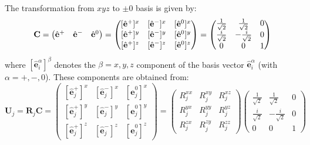 \documentclass[aps, prx, nofootinbib, superscriptaddress]{revtex4-2}
\begin{document}
The transformation from $xyz$ to $\pm0$ basis is given by:
\begin{equation}
    \mathbf{C} = 
    \begin{pmatrix}
        \hat{\bf e}^{+} & \hat{\bf e}^{-} & \hat{\bf e}^{0}
    \end{pmatrix}
    = 
    \begin{pmatrix}
        [\hat{\mathbf{e}}^{+}]^{x} & [\hat{\mathbf{e}}^{-}]^{x} & [\hat{\mathbf{e}}^{0}]^{x} \\[0.1em]
        [\hat{\mathbf{e}}^{+}]^{y} & [\hat{\mathbf{e}}^{-}]^{y} & [\hat{\mathbf{e}}^{0}]^{y} \\[0.1em]
        [\hat{\mathbf{e}}^{+}]^{z} & [\hat{\mathbf{e}}^{-}]^{z} & [\hat{\mathbf{e}}^{0}]^{z} 
    \end{pmatrix}
    = 
    \begin{pmatrix}
        \frac{1}{\sqrt{2}}  &   \frac{1}{\sqrt{2}}  &   0   \\[0.1em]
        \frac{i}{\sqrt{2}}  & - \frac{i}{\sqrt{2}}  &   0   \\[0.1em]
                    0       &           0           &   1   
    \end{pmatrix} 
\end{equation}
where $[\hat{\mathbf{e}}_{i}^{\alpha}]^{\beta}$ denotes the $\beta = x, y, z$ component of the basis vector $\hat{\mathbf{e}}_{i}^{\alpha}$ (with $\alpha = +, -, 0$). 
These components are obtained from:
\begin{equation}
    \mathbf{U}_{j} = \mathbf{R}_{j} \mathbf{C} =
    \begin{pmatrix}
        [\hat{\mathbf{e}}_{j}^{+}]^{x} & [\hat{\mathbf{e}}_{j}^{-}]^{x} & [\hat{\mathbf{e}}_{j}^{0}]^{x} \\[0.25em]
        [\hat{\mathbf{e}}_{j}^{+}]^{y} & [\hat{\mathbf{e}}_{j}^{-}]^{y} & [\hat{\mathbf{e}}_{j}^{0}]^{y} \\[0.25em]
        [\hat{\mathbf{e}}_{j}^{+}]^{z} & [\hat{\mathbf{e}}_{j}^{-}]^{z} & [\hat{\mathbf{e}}_{j}^{0}]^{z} 
    \end{pmatrix}
    = 
    \begin{pmatrix}
        R^{xx}_{j}   &   R^{xy}_{j}   &   R^{xz}_{j}   \\[0.25em]
        R^{yx}_{j}   &   R^{yy}_{j}   &   R^{yz}_{j}   \\[0.25em]
        R^{zx}_{j}   &   R^{zy}_{j}   &   R^{zz}_{j}   
    \end{pmatrix}
    \begin{pmatrix}
        \frac{1}{\sqrt{2}}   &   \frac{1}{\sqrt{2}}   &   0   \\[0.25em]
        \frac{i}{\sqrt{2}}   & - \frac{i}{\sqrt{2}}   &   0   \\[0.25em]
                0     &         0       &   1   
    \end{pmatrix} 
\end{equation}
\end{document}
